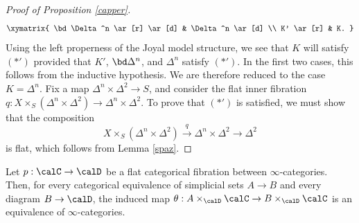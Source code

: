 \begin{proof}[Proof of Proposition \ref{capper}]
$$ \xymatrix{ \bd \Delta^n \ar[r] \ar[d] & \Delta^n \ar[d] \\
K' \ar[r] & K. }$$
Using the left properness of the Joyal model structure, we see that $K$ will satisfy
$(\ast')$ provided that $K'$, $\bd \Delta^n$, and $\Delta^n$ satisfy $(\ast')$. In the first
two cases, this follows from the inductive hypothesis. We are therefore reduced to the
case $K = \Delta^n$. Fix a map $\Delta^n \times \Delta^2 \rightarrow S$, and consider the flat inner fibration $q: X \times_{S} ( \Delta^n \times \Delta^2) \rightarrow \Delta^n \times \Delta^2$.
To prove that $(\ast')$ is satisfied, we must show that the composition
$$ X \times_{S} ( \Delta^n \times \Delta^2) \stackrel{q}{\rightarrow} \Delta^n \times \Delta^2
\rightarrow \Delta^2$$
is flat, which follows from Lemma \ref{spaz}.
\end{proof}

\begin{corollary}\label{silman}
Let $p: \calC \rightarrow \calD$ be a flat categorical fibration between $\infty$-categories.
Then, for every categorical equivalence of simplicial sets $A \rightarrow B$ and
every diagram $B \rightarrow \calD$, the induced map
$\theta: A \times_{\calD} \calC \rightarrow B \times_{\calD} \calC$
is an equivalence of $\infty$-categories.
\end{corollary}

